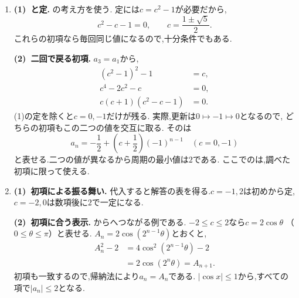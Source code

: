 \begin{enumerate}[label=\textbf{問\arabic*.},leftmargin=3.8em,format=\bookitemlink{practice-special}{solution}{problem}]
                \smallskip
                \textbf{(3)~第2項以降の減少.}
                $\displaystyle n\ge2$では$\displaystyle b_n>0$なので,から$\displaystyle a_n>\sqrt3$である.
                また,
                \[
                  a_{n+1}-a_n=\frac{3-a_n^2}{2a_n}<0
                  \quad(n\ge2).
                \]
                $\displaystyle |q|<1$から$\displaystyle b_n\to0$であり,\,$\displaystyle a_n\to\sqrt3$となる.
                初項は収束先の下にあるが,第2項で上へ移ってから減少する.
                誤差を二乗する式も,この移動と速い収束を表す.
          \item \textbf{(1)~と定.}
                の考え方を使う.
                定には$\displaystyle c=c^2-1$が必要だから,
                \[
                  c^2-c-1=0,\qquad c=\frac{1\pm\sqrt5}{2}.
                \]
                これらの初項なら毎回同じ値になるので,十分条件でもある.

                \smallskip
                \textbf{(2)~二回で戻る初項.}
                $\displaystyle a_3=a_1$から,
                \begin{align*}
                  (c^2-1)^2-1&=c,\\
                  c^4-2c^2-c&=0,\\
                  c(c+1)(c^2-c-1)&=0.
                \end{align*}
                (1)の定を除くと$\displaystyle c=0,-1$だけが残る.
                実際,更新は$\displaystyle 0\mapsto-1\mapsto0$となるので,
                どちらの初項もこの二つの値を交互に取る.
                そのは
                \[
                  a_n=-\frac12+\left(c+\frac12\right)(-1)^{n-1}
                  \quad(c=0,-1)
                \]
                と表せる.二つの値が異なるから周期の最小値は$\displaystyle 2$である.
                ここでのは,調べた初項に限って使える.
          \item \textbf{(1)~初項による振る舞い.}
                代入すると解答の表を得る.$c=-1,2$は初めから定,$c=-2,0$は数項後に$2$で一定になる.

                \smallskip
                \textbf{(2)~初項に合う表示.}
                からへつながる例である.
                $\displaystyle -2\le c\le2$なら$\displaystyle c=2\cos\theta$
                （$\displaystyle 0\le\theta\le\pi$）と表せる.
                $\displaystyle A_n=2\cos(2^{n-1}\theta)$とおくと,
                \begin{align*}
                  A_n^2-2
                    &=4\cos^2(2^{n-1}\theta)-2\\
                    &=2\cos(2^n\theta)=A_{n+1}.
                \end{align*}
                初項も一致するので,帰納法により$\displaystyle a_n=A_n$である.
                $\displaystyle |\cos x|\le1$から,すべての項で$\displaystyle |a_n|\le2$となる.


\end{enumerate}
